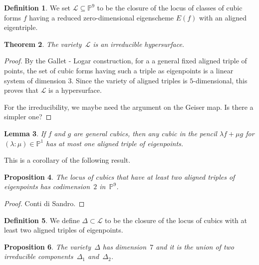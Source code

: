\documentclass[12pt, a4paper, reqno, captions=tableheading,bibliography=totoc]{scrartcl}
\theoremstyle{plain}
\newtheorem{lemma}{Lemma}[section]
\newtheorem{prop}[lemma]{Proposition}
\newtheorem{theorem}[lemma]{Theorem}
\theoremstyle{definition}
\newtheorem{definition}[lemma]{Definition}
\newcommand{\p}{\mathbb{P}}
\begin{document}
\begin{definition}
 We set $\mathcal{L} \subseteq \p^9$ to be the closure of the locus of classes of cubic forms $f$ having a reduced zero-dimensional eigenscheme $E(f)$ with an aligned eigentriple.
\end{definition}

\begin{theorem}
The variety~$\mathcal{L}$ is an irreducible hypersurface.
\end{theorem}

\begin{proof}
By the Gallet - Logar construction, for a a general fixed aligned triple of points, the set of cubic forms having such a triple as eigenpoints is a linear system of dimension 3. Since the variety of aligned triples is $5$-dimensional, this proves that $\mathcal{L}$ is a hypersurface.

For the irreducibility, we maybe need the argument on the Geiser map. Is there a simpler one?
\end{proof}

\begin{lemma}
\label{lemma:pencil_one_aligned}
 If $f$ and $g$ are general cubics, then any cubic in the pencil $\lambda f + \mu g$ for $(\lambda: \mu) \in \p^1$ has at most one aligned triple of eigenpoints.
\end{lemma}

This is a corollary of the following result.

\begin{prop}
    The locus of cubics that have at least two aligned triples of eigenpoints has codimension~$2$ in~$\p^9$.
\end{prop}
\begin{proof}
    Conti di Sandro.
\end{proof}

\begin{definition}
 We define $\Delta \subset \mathcal{L}$ to be the closure of the locus of cubics with at least two aligned triples of eigenpoints.
\end{definition}

\begin{prop}
  The variety~$\Delta$ has dimension~$7$ and it is the union of two irreducible components~$\Delta_1$ and~$\Delta_2$.
\end{prop}
\end{document}
